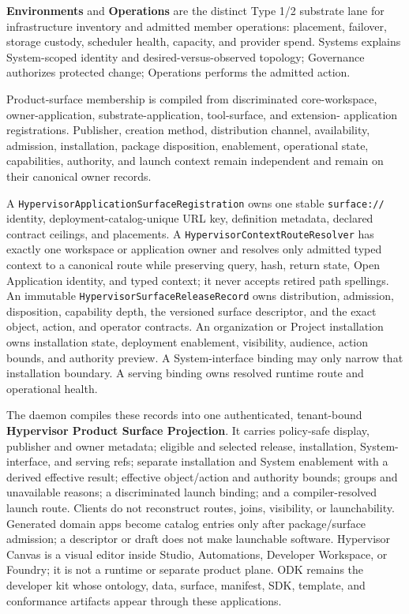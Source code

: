 \documentclass[
  11pt,
]{article}
\begin{document}
\textbf{Environments} and \textbf{Operations} are the distinct Type 1/2
substrate lane for infrastructure inventory and admitted member operations:
placement, failover, storage custody, scheduler health, capacity, and provider
spend. Systems explains System-scoped identity and desired-versus-observed
topology; Governance authorizes protected change; Operations performs the
admitted action.

Product-surface membership is compiled from discriminated core-workspace,
owner-application, substrate-application, tool-surface, and extension-
application registrations. Publisher, creation method, distribution channel,
availability, admission, installation, package disposition, enablement,
operational state, capabilities, authority, and launch context remain
independent and remain on their canonical owner records.

A \texttt{HypervisorApplicationSurfaceRegistration} owns one stable
\texttt{surface://} identity, deployment-catalog-unique URL key, definition
metadata, declared contract ceilings, and placements. A
\texttt{HypervisorContextRouteResolver} has exactly one workspace or
application owner and resolves only admitted typed context to a canonical route
while preserving query, hash, return state, Open Application identity, and
typed context; it never accepts retired path spellings. An immutable
\texttt{HypervisorSurfaceReleaseRecord} owns distribution, admission,
disposition, capability depth, the versioned surface descriptor, and the exact
object, action, and operator contracts. An organization or Project
installation owns installation state, deployment enablement, visibility,
audience, action bounds, and authority preview. A System-interface binding may
only narrow that installation boundary. A serving binding owns resolved
runtime route and operational health.

The daemon compiles these records into one authenticated, tenant-bound
\textbf{Hypervisor Product Surface Projection}. It carries policy-safe display,
publisher and owner metadata; eligible and selected release, installation,
System-interface, and serving refs; separate installation and System
enablement with a derived effective result; effective object/action and
authority bounds; groups and unavailable reasons; a discriminated launch
binding; and a compiler-resolved launch route. Clients do not reconstruct
routes, joins, visibility, or launchability. Generated domain apps become catalog
entries only after package/surface admission; a descriptor or draft does not
make launchable software. Hypervisor Canvas is a visual editor inside Studio,
Automations, Developer Workspace, or Foundry; it is not a runtime or separate
product plane. ODK remains the developer kit whose
ontology, data, surface, manifest, SDK, template, and conformance artifacts
appear through these applications.
\end{document}
